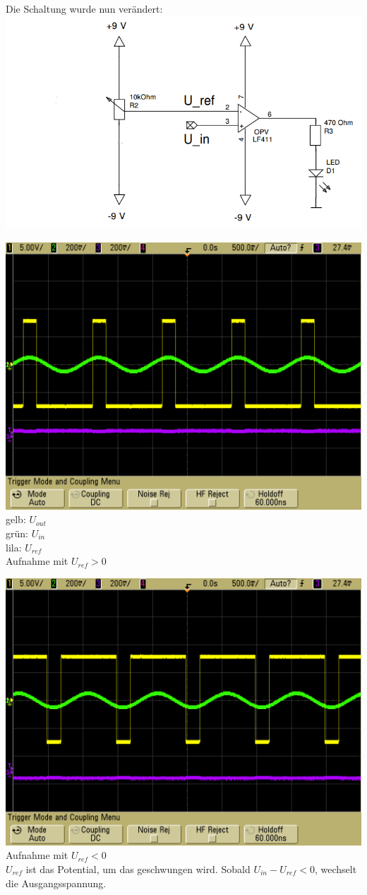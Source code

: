 \documentclass[compress,11pt]{beamer}
\begin{document}
\begin{frame}
Die Schaltung wurde nun verändert:\\

\includegraphics[width=.7\textwidth]{schalt/schalt12}\\


\end{frame}
\begin{frame}
\includegraphics[width=.7\textwidth]{oszi/scope_53}\\
gelb: $U_{out}$\\
grün: $U_{in}$\\
lila: $U_{ref}$\\
Aufnahme mit $U_{ref} > 0$
\end{frame}

\begin{frame}
\includegraphics[width=.7\textwidth]{oszi/scope_54}\\
Aufnahme mit $U_{ref} < 0$\\
$U_{ref}$ ist das Potential, um das geschwungen wird. Sobald $U_{in} - U_{ref} < 0$, wechselt die Ausgangsspannung.
\end{frame}
\end{document}
